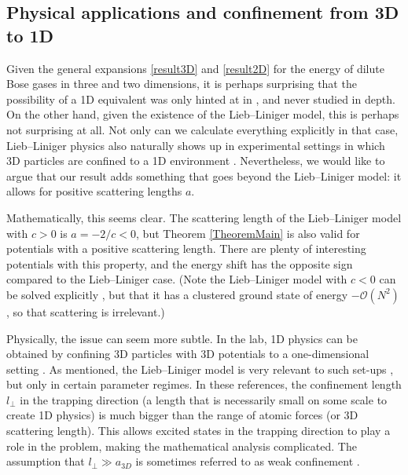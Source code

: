 \documentclass[a4paper,11pt]{article}
\numberwithin{equation}{section}
\begin{document}
\subsection{Physical applications and confinement from 3D to 1D}
\label{SecConfinement}
Given the general expansions \eqref{result3D} and \eqref{result2D} for the energy of dilute Bose gases in three and two dimensions, it is perhaps surprising that the possibility of a 1D equivalent was only hinted at in \cite{astrakharchik2010low}, and never studied in depth. On the other hand, given the existence of the Lieb--Liniger model, this is perhaps not surprising at all. Not only can we calculate everything explicitly in that case, Lieb--Liniger physics also naturally shows up in experimental settings in which 3D particles are confined to a 1D environment \cite{olshanii1998atomic,lieb2003one,lieb2004one,seiringer2008lieb}. Nevertheless, we would like to argue that our result adds something that goes beyond the Lieb--Liniger model: it allows for positive scattering lengths $a$.

Mathematically, this seems clear. The scattering length of the Lieb--Liniger model with $c>0$ is $a=-2/c<0$, but Theorem \ref{TheoremMain} is also valid for potentials with a positive scattering length. There are plenty of interesting potentials with this property, and the energy shift has the opposite sign compared to the Lieb--Liniger case. (Note the Lieb--Liniger model with $c<0$ can be solved explicitly \cite{calabrese2007correlation}, but that it has a clustered ground state of energy $-\mathcal{O}(N^2)$ \cite{lieb1963exact,mcguire1964study}, so that scattering is irrelevant.)

Physically, the issue can seem more subtle. In the lab, 1D physics can be obtained by confining 3D particles with 3D potentials to a one-dimensional setting \cite{schreck2001quasipure,gorlitz2001realization,greiner2001exploring,moritz2003exciting}. As mentioned, the Lieb--Liniger model is very relevant to such set-ups \cite{olshanii1998atomic,lieb2003one,lieb2004one,seiringer2008lieb}, but only in certain parameter regimes. In these references, the confinement length $l_\perp$ in the trapping direction (a length that is necessarily small on some scale to create 1D physics) is much bigger than the range of atomic forces (or 3D scattering length). This allows excited states in the trapping direction to play a role in the problem, making the mathematical analysis complicated. The assumption that $l_\perp\gg a_{3D}$ is sometimes referred to as weak confinement \cite{bloch2008many}. 
\end{document}
